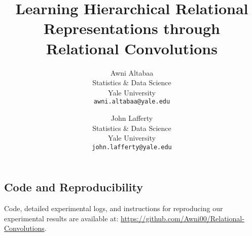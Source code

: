 \documentclass{article}
\title{Learning Hierarchical Relational Representations through \\ Relational Convolutions}
\author{
    Awni Altabaa\\
    Statistics \& Data Science\\
    Yale University\\
    \texttt{awni.altabaa@yale.edu}
    \and
    John Lafferty\\
    Statistics \& Data Science\\
    Yale University\\
    \texttt{john.lafferty@yale.edu}
    }
\date{}
\begin{document}
\maketitle









% 






\subsection*{Code and Reproducibility}
Code, detailed experimental logs, and instructions for reproducing our experimental results are available at: \url{https://github.com/Awni00/Relational-Convolutions}.



% 
% 

\clearpage
\newpage
\appendix


\clearpage\newpage

\clearpage\newpage

\clearpage\newpage

\end{document}
